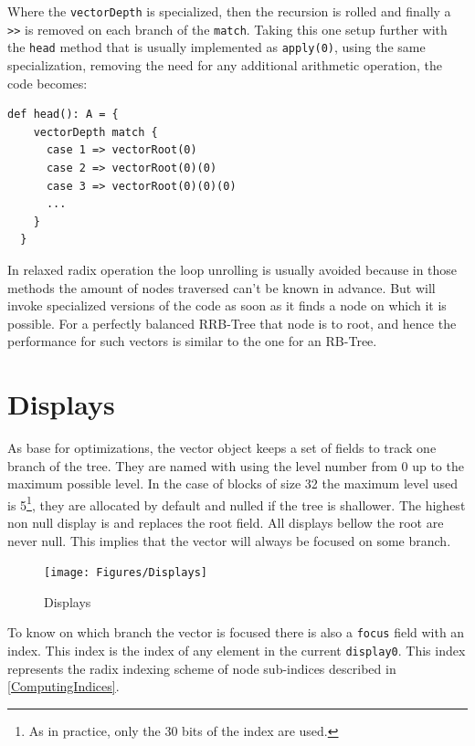Where the \texttt{vectorDepth} is specialized, then the recursion is rolled and finally a \texttt{>>} is removed on each branch of the \texttt{match}. Taking this one setup further with the \texttt{head} method that is usually implemented as \texttt{apply(0)}, using the same specialization, removing the need for any additional arithmetic operation, the code becomes:

\begin{lstlisting}[frame=single]
def head(): A = {
    vectorDepth match {
      case 1 => vectorRoot(0)
      case 2 => vectorRoot(0)(0)
      case 3 => vectorRoot(0)(0)(0)
      ...
    }
  }
\end{lstlisting}

In relaxed radix operation the loop unrolling is usually avoided because in those methods the amount of nodes traversed can't be known in advance. But will invoke specialized versions of the code as soon as it finds a node on which it is possible. For a perfectly balanced RRB-Tree that node is to root, and hence the performance for such vectors is similar to the one for an RB-Tree.

\clearpage
\section{Displays}
\label{sec:Displays}
As base for optimizations, the vector object keeps a set of fields to track one branch of the tree. They are named with using the level number from 0 up to the maximum possible level. In the case of blocks of size 32 the maximum level used is 5\footnote{As in practice, only the 30 bits of the index are used.}, they are allocated by default and nulled if the tree is shallower. The highest non null display is and replaces the root field. All displays bellow the root are never null. This implies that the vector will always be focused on some branch.

\begin{figure}[h!]
  \centering
  \texttt{[image: Figures/Displays]}
  \label{Displays}
  \caption{Displays}
\end{figure}

To know on which branch the vector is focused there is also a \texttt{focus} field with an index. This index is the index of any element in the current \texttt{display0}. This index represents the radix indexing scheme of node sub-indices described in \ref{ComputingIndices}. 

